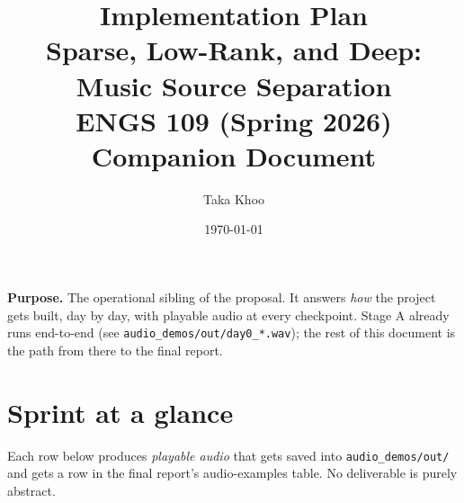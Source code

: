 \documentclass[10pt]{article}
\title{\vspace{-2.0em}\textbf{Implementation Plan}\\[0.3em]
\large Sparse, Low-Rank, and Deep: Music Source Separation\\
\normalsize ENGS 109 (Spring 2026) Companion Document}
\author{Taka Khoo}
\date{\vspace{-1em}\today}
\begin{document}
\maketitle
\vspace{-2em}

\begin{tcolorbox}
\textbf{Purpose.}\;
The operational sibling of the proposal.  It answers \emph{how} the
project gets built, day by day, with playable audio at every
checkpoint.  Stage A already runs end-to-end (see
\texttt{audio\_demos/out/day0\_*.wav}); the rest of this document is
the path from there to the final report.
\end{tcolorbox}

\section{Sprint at a glance}
Each row below produces \emph{playable audio} that gets saved into
\texttt{audio\_demos/out/} and gets a row in the final report's
audio-examples table.  No deliverable is purely abstract.
\end{document}
